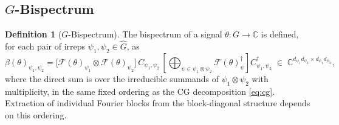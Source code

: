 \documentclass{article}
\theoremstyle{definition}
\newtheorem{definition}[theorem]{Definition}
\theoremstyle{remark}
\newcommand{\FF}{\mathcal{F}}
\newcommand{\C}{\mathbb{C}}
\newcommand{\Ghat}{\widehat{G}}
\begin{document}
\subsection{$G$-Bispectrum}\label{sec:bsp_prelim}

\begin{definition}[$G$-Bispectrum]\label{def:bsp}
The bispectrum of a signal $\theta : G \to \C$ is defined, for each pair of irreps $\psi_1, \psi_2 \in \Ghat$, as
\begin{equation}\label{eq:bsp}
\beta(\theta)_{\psi_1, \psi_2}
= \bigl[\FF(\theta)_{\psi_1} \otimes \FF(\theta)_{\psi_2}\bigr]\,
C_{\psi_1,\psi_2}\,
\left[\bigoplus_{\psi \in \psi_1 \otimes \psi_2} \FF(\theta)_\psi^\dagger\right]
C_{\psi_1,\psi_2}^\dagger
\;\in\;\C^{d_{\psi_1}d_{\psi_2} \times d_{\psi_1}d_{\psi_2}},
\end{equation}
where the direct sum is over the irreducible summands of $\psi_1 \otimes \psi_2$ with multiplicity, in the same fixed ordering as the CG decomposition \eqref{eq:cg}. Extraction of individual Fourier blocks from the block-diagonal structure depends on this ordering.
\end{definition}
\end{document}
